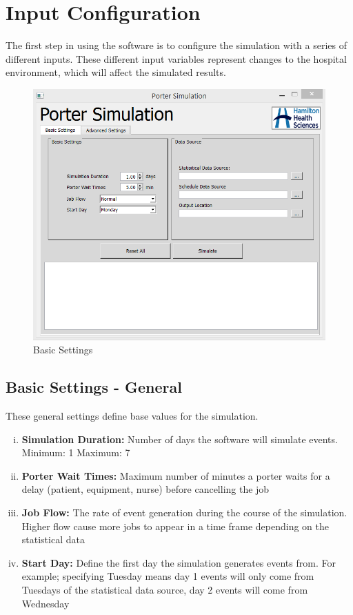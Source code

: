 \documentclass[paper=letter, fontsize=10pt]{scrartcl}
\numberwithin{equation}{section}		%
\numberwithin{figure}{section}			%
\numberwithin{table}{section}				%
\begin{document}
\section{Input Configuration}
The first step in using the software is to configure the simulation with a series of different inputs. These different input variables represent changes to the hospital environment, which will affect the simulated results.

	\begin{figure}[!htbp]
	\begin{center}
		\includegraphics[width=1\columnwidth, height=0.5\textheight, keepaspectratio]{BasicSettings.png}
		\caption{Basic Settings}
	\end{center}
	\end{figure} 
	\subsection{Basic Settings - General}
	These general settings define base values for the simulation.
	\begin{enumerate}[(i)]
		\item \textbf{Simulation Duration:} Number of days the software will simulate events. Minimum: 1 Maximum: 7
		\item \textbf{Porter Wait Times:} Maximum number of minutes a porter waits for a delay (patient, equipment, nurse) before cancelling the job
		\item \textbf{Job Flow:} The rate of event generation during the course of the simulation. Higher flow cause more jobs to appear in a time frame depending on the statistical data
		\item \textbf{Start Day:} Define the first day the simulation generates events from. For example; specifying Tuesday means day 1 events will only come from Tuesdays of the statistical data source, day 2 events will come from Wednesday
	\end{enumerate}
	
\end{document}
